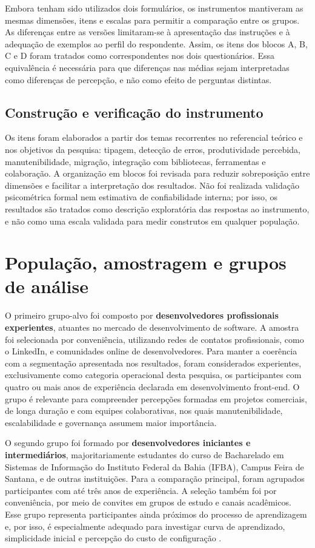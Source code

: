 Embora tenham sido utilizados dois formulários, os instrumentos mantiveram as mesmas dimensões, itens e escalas para permitir a comparação entre os grupos. As diferenças entre as versões limitaram-se à apresentação das instruções e à adequação de exemplos ao perfil do respondente. Assim, os itens dos blocos A, B, C e D foram tratados como correspondentes nos dois questionários. Essa equivalência é necessária para que diferenças nas médias sejam interpretadas como diferenças de percepção, e não como efeito de perguntas distintas.

\subsection{Construção e verificação do instrumento}

Os itens foram elaborados a partir dos temas recorrentes no referencial teórico e nos objetivos da pesquisa: tipagem, detecção de erros, produtividade percebida, manutenibilidade, migração, integração com bibliotecas, ferramentas e colaboração. A organização em blocos foi revisada para reduzir sobreposição entre dimensões e facilitar a interpretação dos resultados. Não foi realizada validação psicométrica formal nem estimativa de confiabilidade interna; por isso, os resultados são tratados como descrição exploratória das respostas ao instrumento, e não como uma escala validada para medir construtos em qualquer população.
\section{População, amostragem e grupos de análise}

O primeiro grupo-alvo foi composto por \textbf{desenvolvedores profissionais experientes}, atuantes no mercado de desenvolvimento de software. A amostra foi selecionada por conveniência, utilizando redes de contatos profissionais, como o LinkedIn, e comunidades online de desenvolvedores. Para manter a coerência com a segmentação apresentada nos resultados, foram considerados experientes, exclusivamente como categoria operacional desta pesquisa, os participantes com quatro ou mais anos de experiência declarada em desenvolvimento front-end. O grupo é relevante para compreender percepções formadas em projetos comerciais, de longa duração e com equipes colaborativas, nos quais manutenibilidade, escalabilidade e governança assumem maior importância.

O segundo grupo foi formado por \textbf{desenvolvedores iniciantes e intermediários}, majoritariamente estudantes do curso de Bacharelado em Sistemas de Informação do Instituto Federal da Bahia (IFBA), Campus Feira de Santana, e de outras instituições. Para a comparação principal, foram agrupados participantes com até três anos de experiência. A seleção também foi por conveniência, por meio de convites em grupos de estudo e canais acadêmicos. Esse grupo representa participantes ainda próximos do processo de aprendizagem e, por isso, é especialmente adequado para investigar curva de aprendizado, simplicidade inicial e percepção do custo de configuração \cite{shrestha2022}.

